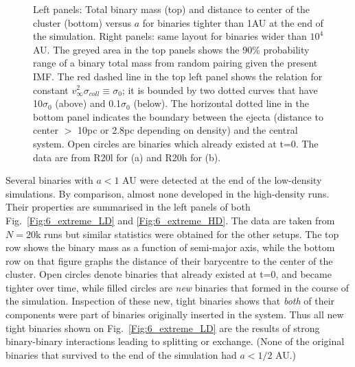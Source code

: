 \begin{figure}
\begin{center}
\begin{subfigure}[b]{0.9\textwidth}
    \end{subfigure}
\caption{Left panels: Total binary mass (top) and distance to center of the cluster (bottom) versus $a$ for binaries tighter than 1AU at the end of the simulation. Right panels: same layout for binaries wider than $10^4$AU. The greyed area in the top panels shows the 90\% probability range of a binary total mass from random pairing given the present IMF. The  red dashed line in the top left panel shows the relation for  constant $v^2_\infty \sigma_{coll} \equiv \sigma_0$; it is bounded by two dotted curves that have 10$\sigma_0$ (above) and 0.1$\sigma_0$ (below). The horizontal dotted line in the bottom panel indicates the boundary between the ejecta (distance to center $>$ 10pc or 2.8pc depending on density) and the central system. Open circles are binaries which already existed at t=0. The data are from R20l for (a) and R20h for (b).}
\label{Fig:6_extreme}
\end{center}
\end{figure}


Several binaries with $a < 1 $ AU were detected at the end of the low-density simulations. By comparison, almost none developed in the high-density runs. Their properties are summarised in the left panels of both Fig.~\ref{Fig:6_extreme_LD} and \ref{Fig:6_extreme_HD}. 
The data are taken from $N = 20$k runs but similar statistics were obtained for the other setups. 
The top row shows the binary mass as a function of semi-major axis, while the  bottom row on that figure  graphs the distance of their barycentre to the center of the cluster. Open circles denote binaries that already existed at t=0, and became tighter over time, while filled circles are {\it new} binaries that formed in the course of the simulation. Inspection of these new, tight  binaries shows that {\it both} of their components were part of  binaries originally inserted in the system. Thus all new tight binaries shown on Fig.~\ref{Fig:6_extreme_LD}  are the results of strong binary-binary interactions leading to splitting or exchange. (None of the original  binaries that survived 	to the end of the simulation had  $a < 1/2 $ AU.)
	
 
